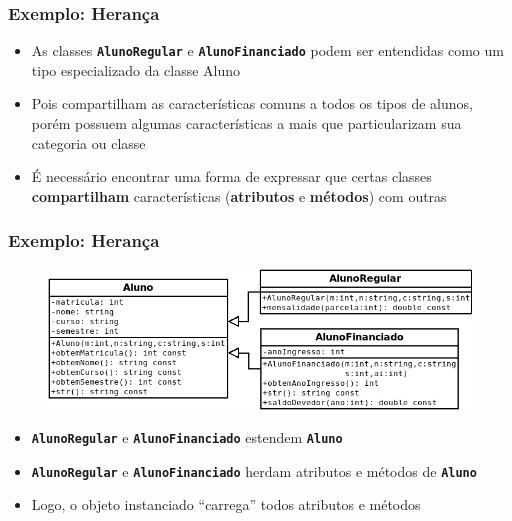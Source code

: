 \documentclass[aspectratio=169]{beamer}
\begin{document}
\begin{frame}\frametitle{Exemplo: Herança}
\begin{itemize}
	\item As classes \textbf{\texttt{AlunoRegular}} e \textbf{\texttt{AlunoFinanciado}} podem ser entendidas como um tipo especializado da classe Aluno
	\item Pois compartilham as características comuns a todos os tipos de alunos, porém possuem algumas características a mais que
particularizam sua categoria ou classe
	\item É necessário encontrar uma forma de expressar que certas classes \textbf{compartilham} características (\textbf{atributos} e \textbf{métodos}) com outras
\end{itemize}
\end{frame}

\begin{frame}\frametitle{Exemplo: Herança}
\begin{figure}[h]
	\includegraphics[height=0.45\paperheight]{pucrs-ec-poo-unidade_13-heranca-laminas-exemplo_aluno_com_heranca.png}
\end{figure}
\begin{itemize}
	\item \textbf{\texttt{AlunoRegular}} e \textbf{\texttt{AlunoFinanciado}} estendem \textbf{\texttt{Aluno}}
	\item \textbf{\texttt{AlunoRegular}} e \textbf{\texttt{AlunoFinanciado}} herdam atributos e métodos de \textbf{\texttt{Aluno}}
	\item Logo, o objeto instanciado ``carrega'' todos atributos e métodos
\end{itemize}
\end{frame}
\end{document}
